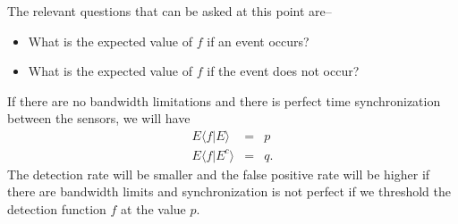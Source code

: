 The relevant questions that can be asked at this point are--
\begin{itemize}
\item What is the expected value of $f$ if an event occurs? \item
What is the expected value of $f$ if the event does not occur?
\end{itemize}
If there are no bandwidth limitations and there is perfect time
synchronization between the sensors, we will have
\begin{eqnarray}
  E\langle f|E\rangle &=& p \nonumber\\
E\langle f|E^c\rangle   &=& q\label{eqn:perfectsync}.
\end{eqnarray}
The detection rate will be smaller and the false positive rate will be higher if there are bandwidth limits
and synchronization is not perfect if we threshold the detection function $f$ at the value $p$.

